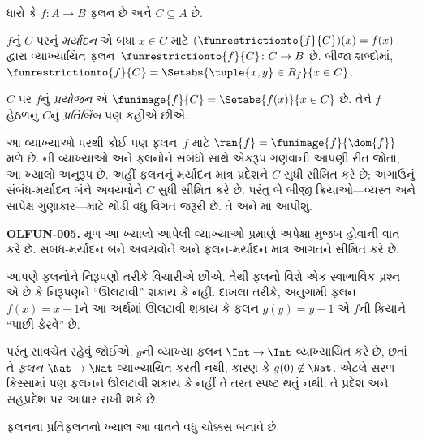 \begin{defn}
ધારો કે $f \colon A \to B$ ફલન છે અને $C\subseteq A$ છે.

$f$નું $C$ પરનું \emph{મર્યાદન} એ બધા $x \in C$ માટે
$(\funrestrictionto{f}{C})(x) = f(x)$ દ્વારા વ્યાખ્યાયિત
ફલન~$\funrestrictionto{f}{C}\colon C \to B$ છે.
બીજા શબ્દોમાં, $\funrestrictionto{f}{C} = \Setabs{\tuple{x, y} \in R_f}{x \in
C}$.

$C$ પર $f$નું \emph{પ્રયોજન} એ $\funimage{f}{C} =
\Setabs{f(x)}{x \in C}$ છે. તેને $f$ હેઠળનું
$C$નું \emph{પ્રતિબિંબ} પણ કહીએ છીએ.
\end{defn}

\begin{explain}
આ વ્યાખ્યાઓ પરથી કોઈ પણ ફલન~$f$ માટે
$\ran{f} =
\funimage{f}{\dom{f}}$ મળે છે.
ની
વ્યાખ્યાઓ અને ફલનોને સંબંધો સાથે એકરૂપ ગણવાની આપણી
રીત જોતાં, આ ખ્યાલો અનુરૂપ છે. અહીં ફલનનું મર્યાદન
માત્ર પ્રદેશને $C$ સુધી સીમિત કરે છે; અગાઉનું સંબંધ-મર્યાદન
બંને અવયવોને $C$ સુધી સીમિત કરે છે. પરંતુ બે બીજી
ક્રિયાઓ---વ્યસ્ત અને સાપેક્ષ ગુણાકાર---માટે થોડી વધુ
વિગત જરૂરી છે. તે  અને
માં આપીશું.
\end{explain}
\begin{editorial}
\textbf{OLFUN-005.} મૂળ આ ખ્યાલો આપેલી વ્યાખ્યાઓ પ્રમાણે અપેક્ષા મુજબ હોવાની વાત કરે છે. સંબંધ-મર્યાદન બંને અવયવોને અને ફલન-મર્યાદન માત્ર આગતને સીમિત કરે છે.
\end{editorial}
\endgroup


\begingroup
\makeatletter{}\makeatother

\label{guunit:OLP-0024}


\begin{explain}
આપણે ફલનોને નિરૂપણો તરીકે વિચારીએ છીએ. તેથી ફલનો
વિશે એક સ્વાભાવિક પ્રશ્ન એ છે કે નિરૂપણને “ઊલટાવી”
શકાય કે નહીં. દાખલા તરીકે, અનુગામી ફલન
$f(x) = x + 1$ને આ અર્થમાં ઊલટાવી શકાય કે ફલન
$g(y) = y - 1$ એ $f$ની ક્રિયાને “પાછી ફેરવે” છે.

પરંતુ સાવચેત રહેવું જોઈએ. $g$ની વ્યાખ્યા ફલન
$\Int \to \Int$ વ્યાખ્યાયિત કરે છે, છતાં તે
\emph{ફલન} $\Nat
\to \Nat$ વ્યાખ્યાયિત કરતી નથી, કારણ કે
$g(0) \notin \Nat$. એટલે સરળ કિસ્સામાં પણ ફલનને
ઊલટાવી શકાય કે નહીં તે તરત સ્પષ્ટ થતું નથી;
તે પ્રદેશ અને સહપ્રદેશ પર આધાર રાખી શકે છે.

ફલનના પ્રતિફલનનો ખ્યાલ આ વાતને વધુ ચોક્કસ બનાવે છે.
\end{explain}


